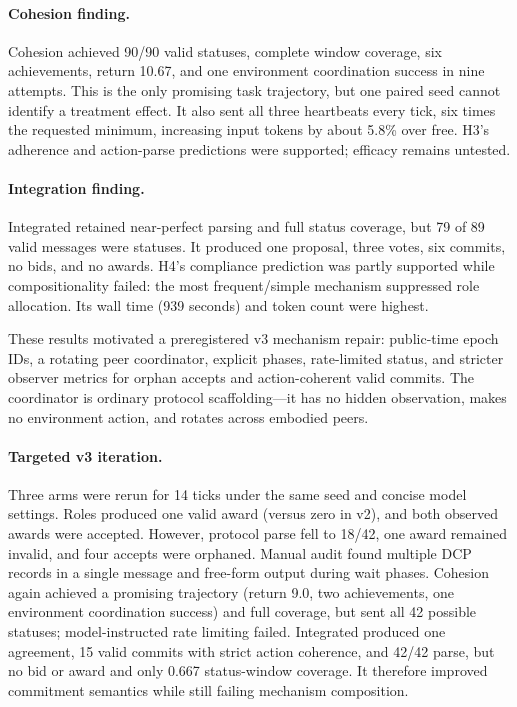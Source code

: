 \documentclass[11pt]{article}
\begin{document}
\paragraph{Cohesion finding.} Cohesion achieved 90/90 valid statuses, complete window coverage, six achievements, return 10.67, and one environment coordination success in nine attempts. This is the only promising task trajectory, but one paired seed cannot identify a treatment effect. It also sent all three heartbeats every tick, six times the requested minimum, increasing input tokens by about 5.8\% over free. H3's adherence and action-parse predictions were supported; efficacy remains untested.

\paragraph{Integration finding.} Integrated retained near-perfect parsing and full status coverage, but 79 of 89 valid messages were statuses. It produced one proposal, three votes, six commits, no bids, and no awards. H4's compliance prediction was partly supported while compositionality failed: the most frequent/simple mechanism suppressed role allocation. Its wall time (939 seconds) and token count were highest.

These results motivated a preregistered v3 mechanism repair: public-time epoch IDs, a rotating peer coordinator, explicit phases, rate-limited status, and stricter observer metrics for orphan accepts and action-coherent valid commits. The coordinator is ordinary protocol scaffolding---it has no hidden observation, makes no environment action, and rotates across embodied peers.

\paragraph{Targeted v3 iteration.} Three arms were rerun for 14 ticks under the same seed and concise model settings. Roles produced one valid award (versus zero in v2), and both observed awards were accepted. However, protocol parse fell to 18/42, one award remained invalid, and four accepts were orphaned. Manual audit found multiple DCP records in a single message and free-form output during wait phases. Cohesion again achieved a promising trajectory (return 9.0, two achievements, one environment coordination success) and full coverage, but sent all 42 possible statuses; model-instructed rate limiting failed. Integrated produced one agreement, 15 valid commits with strict action coherence, and 42/42 parse, but no bid or award and only 0.667 status-window coverage. It therefore improved commitment semantics while still failing mechanism composition.
\end{document}
